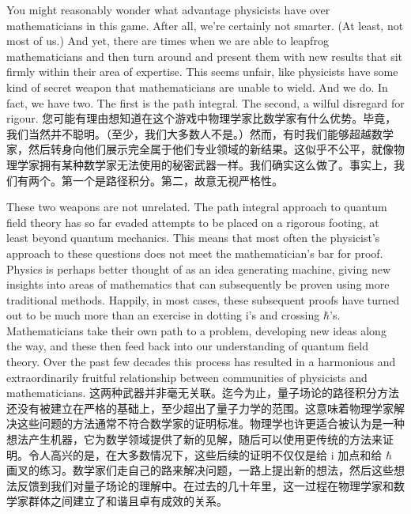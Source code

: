 \documentclass{article}
\begin{document}
\begin{paracol}{2}
You might reasonably wonder what advantage physicists have over mathematicians in this game. After all, we're certainly not smarter. (At least, not most of us.) And yet, there are times when we are able to leapfrog mathematicians and then turn around and present them with new results that sit firmly within their area of expertise. This seems unfair, like physicists have some kind of secret weapon that mathematicians are unable to wield. And we do. In fact, we have two. The first is the path integral. The second, a wilful disregard for rigour.
\switchcolumn
您可能有理由想知道在这个游戏中物理学家比数学家有什么优势。毕竟，我们当然并不聪明。（至少，我们大多数人不是。）然而，有时我们能够超越数学家，然后转身向他们展示完全属于他们专业领域的新结果。这似乎不公平，就像物理学家拥有某种数学家无法使用的秘密武器一样。我们确实这么做了。事实上，我们有两个。第一个是路径积分。第二，故意无视严格性。
\switchcolumn*

These two weapons are not unrelated. The path integral approach to quantum field theory has so far evaded attempts to be placed on a rigorous footing, at least beyond quantum mechanics. This means that most often the physicist's approach to these questions does not meet the mathematician's bar for proof. Physics is perhaps better thought of as an idea generating machine, giving new insights into areas of mathematics that can subsequently be proven using more traditional methods. Happily, in most cases, these subsequent proofs have turned out to be much more than an exercise in dotting i's and crossing $\hbar$'s. Mathematicians take their own path to a problem, developing new ideas along the way, and these then feed back into our understanding of quantum field theory. Over the past few decades this process has resulted in a harmonious and extraordinarily fruitful relationship between communities of physicists and mathematicians.
\switchcolumn
这两种武器并非毫无关联。迄今为止，量子场论的路径积分方法还没有被建立在严格的基础上，至少超出了量子力学的范围。这意味着物理学家解决这些问题的方法通常不符合数学家的证明标准。物理学也许更适合被认为是一种想法产生机器，它为数学领域提供了新的见解，随后可以使用更传统的方法来证明。令人高兴的是，在大多数情况下，这些后续的证明不仅仅是给 i 加点和给 $\hbar$ 画叉的练习。数学家们走自己的路来解决问题，一路上提出新的想法，然后这些想法反馈到我们对量子场论的理解中。在过去的几十年里，这一过程在物理学家和数学家群体之间建立了和谐且卓有成效的关系。
\switchcolumn*


\end{paracol}
\end{document}
